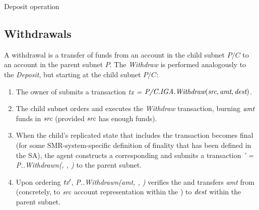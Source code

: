  

\begin{algorithm}[H]
\footnotesize
\caption{Deposit operation}\label{alg:deposit}
  \DontPrintSemicolon

\end{algorithm}

\subsection{Withdrawals}
\label{sec:withdraw}

A withdrawal is a transfer of funds from an account \src in the child subnet $P/C$ to an account \dest in the parent subnet $P$.
The \emph{Withdraw} is performed analogously to the \emph{Deposit}, but starting at the child subnet $P/C$:
\begin{enumerate}
  \item The owner of \src submits a transaction \emph{tx =} $\textit{P/C.\textit{IGA}.Withdraw}(\textit{src}, \textit{amt}, \textit{dest})$.
    \item The child subnet orders and executes the \emph{Withdraw} transaction, burning $\textit{amt}$ funds in $\textit{src}$ (provided $\textit{src}$ has enough funds).
    \item When the child's replicated state that includes the transaction becomes final (for some SMR-system-specific definition of finality that has been defined in the SA), the \ipc agent constructs a corresponding \pof and submits a transaction \textit{\tx' = P.\sa.Withdrawn(\fil, \dest, \pof)} to the parent subnet.
    \item Upon ordering $\textit{tx}'$, \emph{P.\sa.Withdrawn(amt, \dest, \pof)} verifies the \pof and transfers \emph{amt} from \sa (concretely, to $\textit{src}$ account representation within the \sa) to $\textit{dest}$ within the parent subnet.
\end{enumerate}

